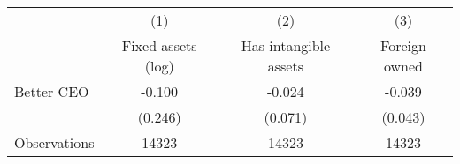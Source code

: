 {
\def\sym#1{\ifmmode^{#1}\else\(^{#1}\)\fi}
\begin{tabular}{l*{3}{c}}
\hline\hline
                    &\multicolumn{1}{c}{(1)}&\multicolumn{1}{c}{(2)}&\multicolumn{1}{c}{(3)}\\
                    &\multicolumn{1}{c}{Fixed assets (log)}&\multicolumn{1}{c}{Has intangible assets}&\multicolumn{1}{c}{Foreign owned}\\
\hline
Better CEO          &      -0.100         &      -0.024         &      -0.039         \\
                    &     (0.246)         &     (0.071)         &     (0.043)         \\
\hline
Observations        &       14323         &       14323         &       14323         \\
\hline\hline
\end{tabular}
}

